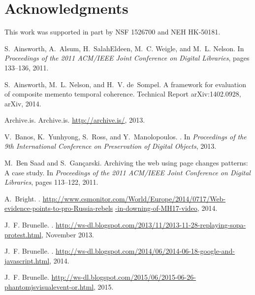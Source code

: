 \documentclass{sig-alternate}
\begin{document}
\section{Acknowledgments}
This work was supported in part by NSF 1526700 and NEH HK-50181.



%  
\begin{thebibliography}{10}

S.~Ainsworth, A.~Alsum, H.~SalahEldeen, M.~C. Weigle, and M.~L. Nelson.
\newblock In {\em {Proceedings of the 2011 ACM/IEEE Joint Conference on Digital
  Libraries}}, pages 133--136, 2011.

S.~Ainsworth, M.~L. Nelson, and H.~V. de~Sompel.
\newblock A framework for evaluation of composite memento temporal coherence.
\newblock Technical Report arXiv:1402.0928, arXiv, 2014.

{Archive.is}.
\newblock Archive.is.
\newblock \url{http://archive.is/}, 2013.

V.~Banos, K.~Yunhyong, S.~Ross, and Y.~Manolopoulos.
.
\newblock In {\em Proceedings of the 9th International Conference on
  Preservation of Digital Objects}, 2013.

M.~{Ben Saad} and S.~Gançarski.
\newblock Archiving the web using page changes patterns: A case study.
\newblock In {\em {Proceedings of the 2011 ACM/IEEE Joint Conference on Digital
  Libraries}}, pages 113--122, 2011.

A.~Bright.
.
\newblock
  \url{http://www.csmonitor.com/World/Europe/2014/0717/Web-evidence-points-to-pro-Russia-rebels}
  \url{-in-downing-of-MH17-video}, 2014.

J.~F. Brunelle.
.
\newblock
  \url{http://ws-dl.blogspot.com/2013/11/2013-11-28-replaying-sopa-protest.html},
  November 2013.

J.~F. Brunelle.
.
\newblock
  \url{http://ws-dl.blogspot.com/2014/06/2014-06-18-google-and-javascript.html},
  2014.

J.~F. Brunelle.
\newblock
  \url{http://ws-dl.blogspot.com/2015/06/2015-06-26-phantomjsvisualevent-or.html},
  2015.


\end{thebibliography}
\end{document}
